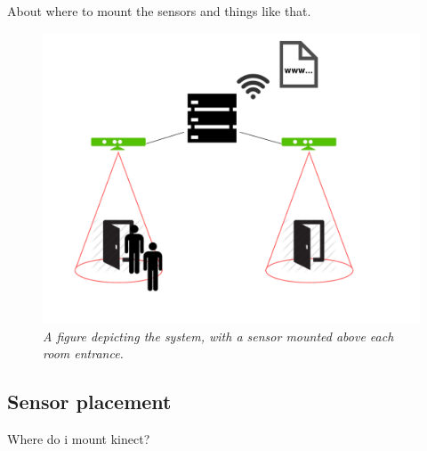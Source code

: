 About where to mount the sensors and things like that.

\begin{figure}[htb]
	\centering
	\includegraphics[width=\linewidth]{images/system_overview.pdf}
	\caption[Overview system setup]{\textit{A figure depicting the system, with a sensor mounted above each room entrance.}}
	\label{fig:system_overview}  %
\end{figure}

\subsection{Sensor placement}
Where do i mount kinect? 
